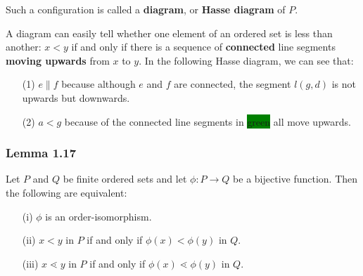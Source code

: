 \documentclass[12pt, letterpaper, oneside]{book}
\begin{document}
Such a configuration is called a \textbf{diagram}, or \textbf{Hasse diagram} of $P$.

A diagram can easily tell whether one element of an ordered set is less than another: $x < y$ if and only if there is a
sequence of \textbf{connected} line segments \textbf{moving upwards} from $x$ to $y$. In the following Hasse diagram, we
can see that:
\begin{enumerate}
  \item[(1)] $e \parallel f$ because although $e$ and $f$ are connected, the segment $l(g, d)$ is not upwards but
        downwards.
  \item[(2)] $a < g$ because of the connected line segments in \colorbox{green}{green} all move upwards.
\end{enumerate}


\subsubsection{Lemma 1.17}

Let $P$ and $Q$ be finite ordered sets and let $\phi: P \rightarrow Q$ be a bijective function. Then the following are
equivalent:
\begin{enumerate}
  \item[(i)] $\phi$ is an order-isomorphism.
  \item[(ii)] $x < y$ in $P$ if and only if $\phi(x) < \phi(y)$ in $Q$.
  \item[(iii)] $x \lessdot y$ in $P$ if and only if $\phi(x) \lessdot \phi(y)$ in $Q$.
\end{enumerate}

\end{document}
